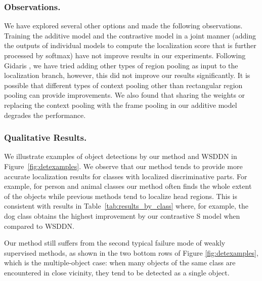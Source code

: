 \subsubsection{Observations.}

We have explored several other options and made the following observations.
Training the additive model and the contrastive model in a joint manner (adding the outputs of individual models to compute the localization score that is further processed by softmax) have not improve results in our experiments.
Following Gidaris \etal\cite{Gidaris_2015_ICCV}, we have tried adding other types of region pooling as input to the localization branch, however, this did not improve our results significantly. It is possible that different types of context pooling other than rectangular region pooling can provide improvements. We also found that sharing the weights or replacing the context pooling with the frame pooling in our additive model degrades the performance.





\subsubsection{Qualitative Results.} 
We illustrate examples of object detections by our method and WSDDN in Figure~\ref{fig:detexamples}.
We observe that our method tends to provide more accurate localization results for 
classes with localized discriminative parts. For example, for person and animal classes our method often finds
the whole extent of the objects while previous methods tend to localize head regions.
This is consistent with results in Table~\ref{tab:results_by_class} where, for example, the dog class obtains the highest improvement by our contrastive S model when compared to WSDDN. 

Our method still suffers from the second typical failure mode of weakly supervised 
methods, as shown in the two bottom rows of Figure \ref{fig:detexamples}, which is the 
multiple-object case: when many objects of the same class are encountered in close 
vicinity, they tend to be detected as a single object.



